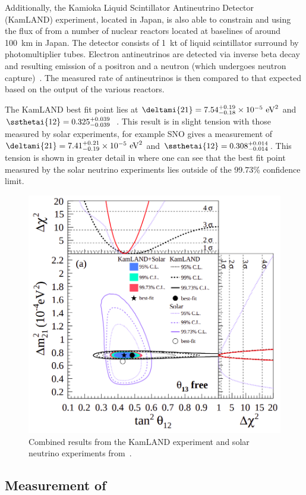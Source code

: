 Additionally, the Kamioka Liquid Scintillator Antineutrino Detector (KamLAND) experiment, located in Japan, is also able to constrain  and  using the flux of \anue from a number of nuclear reactors located at baselines of around 100~km in Japan.
The detector consists of 1~kt of liquid scintillator surround by photomultiplier tubes.
Electron antineutrinos are detected via inverse beta decay and resulting emission of a positron and a neutron (which undergoes neutron capture)~\cite{kamland}.
The measured rate of antineutrinos is then compared to that expected based on the output of the various reactors.

The KamLAND best fit point lies at $\deltami{21} = 7.54^{+0.19}_{-0.18} \times 10^{-5}~\text{eV}^{2}$ and $\ssthetai{12}=0.325^{+0.039}_{-0.039}$~\cite{kamland}.
This result is in slight tension with those measured by solar experiments, for example SNO gives a measurement of $\deltami{21}=7.41^{+0.21}_{-0.19} \times 10^{-5}~\text{eV}^{2}$ and $\ssthetai{12}=0.308^{+0.014}_{-0.014}$.
This tension is shown in greater detail in  where one can see that the best fit point measured by the solar neutrino experiments lies outside of the 99.73\% confidence limit.

\begin{figure}[h]
  \centering
  \includegraphics[width=.7\linewidth]{files/figures/theory/kamlandPlusSolar}
  \caption{Combined results from the KamLAND experiment and solar neutrino experiments from~\cite{kamland}.}
  \label{fig:kamlandPlusSolar}
\end{figure}

\subsection{Measurement of }
\label{sec:theory:currentState:theta13}

